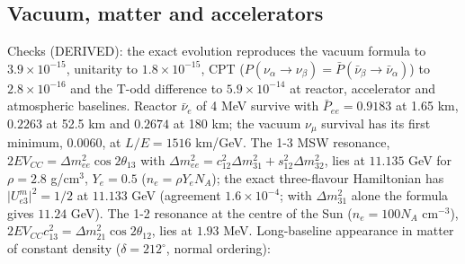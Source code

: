 \documentclass[
  10pt,
]{article}
\begin{document}
\hypertarget{vacuum-matter-and-accelerators}{%
\subsection{Vacuum, matter and
accelerators}\label{vacuum-matter-and-accelerators}}

Checks (DERIVED): the exact evolution reproduces the vacuum formula to
\(3.9\times10^{-15}\), unitarity to \(1.8\times10^{-15}\), CPT
(\(P(\nu_\alpha\to\nu_\beta) = \bar P(\bar\nu_\beta\to\bar\nu_\alpha)\))
to \(2.8\times10^{-16}\) and the T-odd difference to
\(5.9\times10^{-14}\) at reactor, accelerator and atmospheric baselines.
Reactor \(\bar\nu_e\) of 4 MeV survive with \(\bar P_{ee} = 0.9183\) at
1.65 km, \(0.2263\) at 52.5 km and \(0.2674\) at 180 km; the vacuum
\(\nu_\mu\) survival has its first minimum, \(0.0060\), at
\(L/E = 1516\) km/GeV. The 1-3 MSW resonance,
\(2EV_{CC} = \Delta m^2_{ee}\cos2\theta_{13}\) with
\(\Delta m^2_{ee} = c_{12}^2\Delta m^2_{31} + s_{12}^2\Delta m^2_{32}\),
lies at \(11.135\) GeV for \(\rho = 2.8\) g/cm\(^3\), \(Y_e = 0.5\)
(\(n_e = \rho Y_eN_A\)); the exact three-flavour Hamiltonian has
\(\lvert U^m_{e3}\rvert^2 = 1/2\) at \(11.133\) GeV (agreement
\(1.6\times10^{-4}\); with \(\Delta m^2_{31}\) alone the formula gives
\(11.24\) GeV). The 1-2 resonance at the centre of the Sun
(\(n_e = 100N_A\) cm\(^{-3}\)),
\(2EV_{CC}c_{13}^2 = \Delta m^2_{21}\cos2\theta_{12}\), lies at \(1.93\)
MeV. Long-baseline appearance in matter of constant density
(\(\delta = 212^\circ\), normal ordering):
\end{document}

